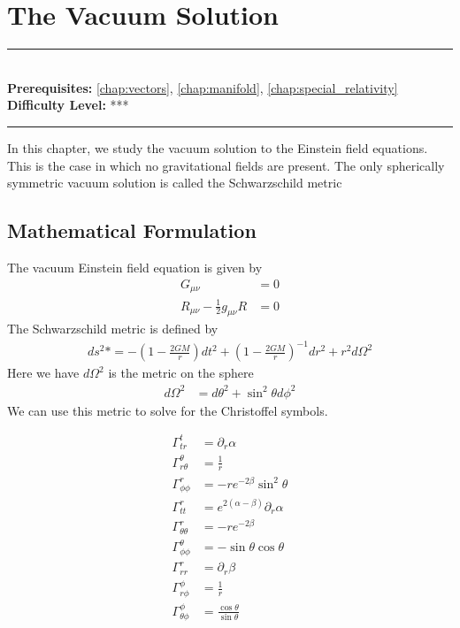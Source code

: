\documentclass[book.tex]{subfiles}
\begin{document}
\chapter{The Vacuum Solution}

\label{chap:vacuum_solution}
\noindent\rule{11cm}{0.4pt} \\
\textbf{Prerequisites:} \autoref{chap:vectors}, \autoref{chap:manifold}, \autoref{chap:special_relativity}  \\
\textbf{Difficulty Level:} *** \\
\noindent\rule{11cm}{0.4pt}
\vspace{5mm}

In this chapter, we study the vacuum solution to the Einstein field equations. This is the case in which no gravitational fields are present. The only spherically symmetric vacuum solution is called the Schwarzschild metric

\section{Mathematical Formulation}

The vacuum Einstein field equation is given by
\begin{align}
    G_{\mu \nu} &= 0\\
    R_{\mu \nu} - \frac{1}{2}g_{\mu \nu}R &= 0
\end{align}
The Schwarzschild metric is defined by
\begin{align}
    ds^2 *= -(1 - \frac{2GM}{r})dt^2 + (1 - \frac{2GM}{r})^{-1} dr^2 + r^2 d\Omega^2
\end{align}
Here we have $d\Omega^2$ is the metric on the sphere
\begin{align}
    d\Omega^2 &= d\theta^2 + \sin^2 \theta d\phi^2
\end{align}
We can use this metric to solve for the Christoffel symbols.

\begin{align}
\Gamma^t_{tr} &= \partial_r \alpha \\
\Gamma^\theta_{r\theta} &= \frac{1}{r} \\
\Gamma^r_{\phi\phi} &= -re^{-2\beta}\sin^2 \theta \\
\Gamma^r_{tt} &= e^{2(\alpha - \beta)} \partial_r \alpha \\
\Gamma^r_{\theta\theta} &= -re^{-2\beta} \\
\Gamma^\theta_{\phi \phi} &= -\sin \theta \cos \theta \\
\Gamma^r_{rr} &= \partial_r \beta \\
\Gamma^\phi_{r\phi} &= \frac{1}{r} \\
\Gamma^\phi_{\theta \phi} &= \frac{\cos \theta}{\sin \theta}
\end{align}
\end{document}
